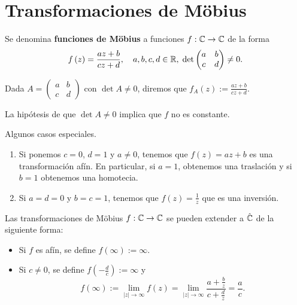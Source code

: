 \section{Transformaciones de Möbius}
\begin{definition}
	Se denomina \textbf{funciones de Möbius} a funciones $\displaystyle f : \mathbb{C} \to \mathbb{C} $ de la forma
	\[f\left(z\right)= \frac{az + b}{cz + d} , \quad a,b,c,d \in \mathbb{R}, \; \det\begin{pmatrix} a & b \\ c & d \end{pmatrix}\neq 0.\]
\end{definition}
\begin{notation}
	Dada $\displaystyle A = \begin{pmatrix} a & b \\ c & d \end{pmatrix} $ con $\displaystyle \det A \neq 0 $, diremos que $\displaystyle f_{A}\left(z\right):=\frac{az+b}{cz+d} $.
\end{notation}
\begin{observation}
La hipótesis de que $\displaystyle \det A \neq 0 $ implica que $\displaystyle f $ no es constante.
\end{observation}
\begin{eg} Algunos casos especiales.
\begin{enumerate}
\item Si ponemos $\displaystyle c = 0 $, $\displaystyle d = 1 $ y $\displaystyle a \neq 0 $, tenemos que $\displaystyle f\left(z\right)=az + b $ es una transformación afín. En particular, si $\displaystyle a = 1 $, obtenemos una traslación y si $\displaystyle b = 1 $ obtenemos una homotecia.  
\item Si $\displaystyle a = d = 0 $ y $\displaystyle b = c = 1 $, tenemos que $\displaystyle f\left(z\right)= \frac{1}{z} $ que es una inversión.
\end{enumerate}
\end{eg}
Las transformaciones de Möbius $\displaystyle f : \mathbb{C} \to \mathbb{C} $ se pueden extender a $\displaystyle \hat{\mathbb{C}} $ de la siguiente forma:
\begin{itemize}
\item Si $\displaystyle f $ es afín, se define $\displaystyle f\left(\infty\right):= \infty  $. 
\item Si $\displaystyle c \neq 0 $, se define $\displaystyle f\left(-\frac{d}{c}\right):=\infty  $ y 
	\[f\left(\infty\right):=\lim_{ \left|z\right| \to \infty }f\left(z\right)=\lim_{ \left|z\right| \to \infty}\frac{a + \frac{b}{z}}{c + \frac{d}{z}} = \frac{a}{c} .\]
\end{itemize}

